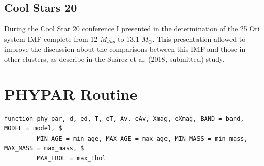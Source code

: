 \documentclass[12pt]{article}
\begin{document}
\subsection{Cool Stars 20}
\label{sec:CS20}
During the Cool Star 20 conference I presented in \citet{Suarez2018} the determination of the 25 Ori system IMF complete from 12 $M_{Jup}$ to 13.1 $M_\odot$. This presentation allowed to improve the discussion about the comparisons between this IMF and those in other clusters, as describe in the Su\'arez et al. (2018, submitted) study.

\section{PHYPAR Routine}
\label{sec_app:phypar}
{\scriptsize
\begin{Verbatim}[tabsize=4]
function phy_par, d, ed, T, eT, Av, eAv, Xmag, eXmag, BAND = band, MODEL = model, $
		 MIN_AGE = min_age, MAX_AGE = max_age, MIN_MASS = min_mass, MAX_MASS = max_mass, $
		 MAX_LBOL = max_Lbol


\end{Verbatim}}
\end{document}
